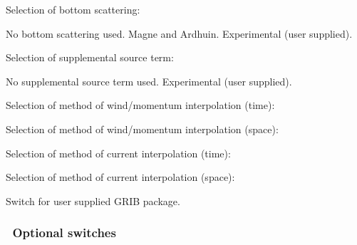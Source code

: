 \noindent
Selection of bottom scattering:
\begin{slist}
 {No bottom scattering used.}
 {Magne and Ardhuin.}
 {Experimental (user supplied).}
\end{slist}

\noindent
Selection of supplemental source term:
\begin{slist}
 {No supplemental source term used.}
 {Experimental (user supplied).}
\end{slist}

\noindent
Selection of method of wind/momentum interpolation (time):
\begin{slist}
\end{slist}

\noindent
Selection of method of wind/momentum interpolation (space):
\begin{slist}
\end{slist}

\noindent
Selection of method of current interpolation (time):
\begin{slist}
\end{slist}

\noindent
Selection of method of current interpolation (space):
\begin{slist}
\end{slist}

\noindent
Switch for user supplied GRIB package.
\begin{slist}
\end{slist}

\vsssub
\subsubsection{~Optional switches} \label{sub:opt_switch}
\vsssub

